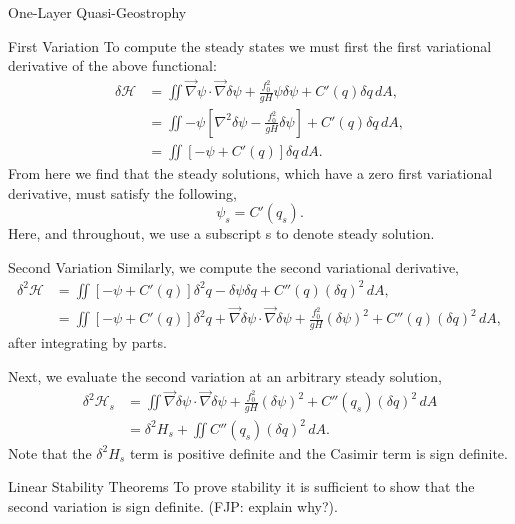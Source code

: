 \documentclass[12pt]{article}
\begin{document}
\begin{section}{One-Layer Quasi-Geostrophy}
    \begin{subsection}{First Variation}
        To compute the steady states we must first the first variational derivative of the above functional:
        \begin{align*}
            \delta \mathcal{H}
            & = \iint \vec\nabla\psi \cdot \vec\nabla \delta \psi + \frac{f_0^2}{g H} \psi \delta \psi + C'(q) \delta q \, dA, \\
            & = \iint -\psi \left[ \nabla^2 \delta \psi - \frac{f_0^2}{g H} \delta \psi \right]  + C'(q) \delta q \, dA, \\
            & = \iint \left[ - \psi + C'(q) \right]  \delta q  \, dA.
        \end{align*}
        From here we find that the steady solutions, which have a zero first variational derivative, must satisfy the following,
        $$
        \psi_s = C'(q_s).
        $$
        Here, and throughout, we use a subscript s to denote steady solution.
    \end{subsection}

    \begin{subsection}{Second Variation}
      Similarly, we compute the second variational derivative,
      \begin{align*}
          \delta^2 \mathcal{H}
          & = \iint \left[ - \psi + C'(q) \right]  \delta^2 q  - \delta \psi \delta q +  C''(q) (\delta q)^2  \, dA, \\
          & = \iint \left[ - \psi + C'(q) \right]  \delta^2 q
          + \vec\nabla \delta \psi \cdot \vec \nabla \delta \psi
          +\frac{f_0^2}{gH} (\delta \psi)^2+  C''(q) (\delta q)^2  \, dA,
      \end{align*}
      after integrating by parts.

      Next, we evaluate the second variation at an arbitrary steady solution,
      \begin{align*}
          \delta^2 \mathcal{H}_s
          & = \iint \vec\nabla \delta \psi \cdot \vec \nabla \delta \psi + \frac{f_0^2}{gH} (\delta \psi)^2+  C''(q_s) (\delta q)^2  \, dA \\
          & = \delta^2 H_s + \iint C''(q_s) (\delta q)^2  \, dA.
      \end{align*}
      Note that the $\delta^2 H_s$ term is positive definite and the Casimir term is sign definite.
    \end{subsection}
    \begin{subsection}{Linear Stability Theorems}
        To prove stability it is sufficient to show that the second variation is sign definite. (FJP: explain why?).


\end{subsection}
\end{section}
\end{document}
